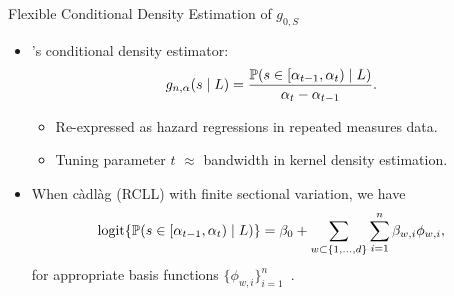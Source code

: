 \documentclass{beamer}
\begin{document}
\begin{frame}[c]{Flexible Conditional Density Estimation of $g_{0,S}$}

\begin{center}
\begin{itemize}
  \itemsep8pt
  \item \cite{diaz2011super}'s conditional density estimator:
    \begin{equation*}
      g_{n, \alpha}(s \mid L) = \frac{\mathbb{P} (s \in [\alpha_{t-1}, \alpha_t)
        \mid L)}{\alpha_t - \alpha_{t-1}}.
    \end{equation*}
    \vspace{-0.5em}
    \begin{itemize}
      \itemsep4pt
      \item Re-expressed as hazard regressions in repeated measures data.
      \item Tuning parameter $t$ $\approx$ bandwidth in kernel density
        estimation.
    \end{itemize}
  \item When c\`{a}dl\`{a}g (RCLL) with finite sectional variation, we have
    {\small{
    \begin{equation*}
     \operatorname{logit} \{\mathbb{P}(s \in [\alpha_{t-1}, \alpha_t) \mid L)\} = \beta_0 +
       \sum_{w \subset\{1,\ldots,d\}} \sum_{i=1}^{n} \beta_{w,i} \phi_{w,i},
    \end{equation*} }
    }
    for appropriate basis functions
    $\{ \phi_{w,i} \}_{i=1}^n$~\citep{gill1995inefficient}.
\end{itemize}
\end{center}

\note{
}

\end{frame}

\end{document}
